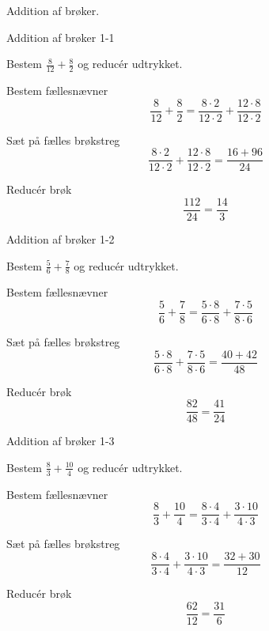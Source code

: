 \documentclass{article}
\begin{document}
Addition af brøker.

	\tableofcontents
	\newpage
	
	\begin{exercise}{Addition af brøker 1-1}
		
		Bestem $\frac{8}{12}+\frac{8}{2}$ og reducér udtrykket.
		
		
		\hint
		
		Bestem fællesnævner
		\[
		\frac{8}{12}+\frac{8}{2}  = \frac{8 \cdot 2}{12 \cdot 2}+\frac{12 \cdot 8}{12\cdot 2} 
		\]
		
		\hint
		
		Sæt på fælles brøkstreg
		\[
		\frac{8 \cdot 2}{12 \cdot 2}+\frac{12 \cdot 8}{12\cdot 2} = \frac{16+96}{24} 
		\]
		
		\hint
		
		Reducér brøk
		\[
		\frac{112}{24} = \frac{14}{3}
		\]
		
	\end{exercise}
	
	\newpage
	
	\begin{exercise}{Addition af brøker 1-2}
		
		Bestem $\frac{5}{6}+\frac{7}{8}$ og reducér udtrykket.
		
		
		\hint
		
		Bestem fællesnævner
		\[
		\frac{5}{6}+\frac{7}{8}  = \frac{5 \cdot 8 }{6 \cdot 8}+\frac{7 \cdot 5}{8\cdot 6} 
		\]
		
		\hint
		
		Sæt på fælles brøkstreg
		\[
		\frac{5 \cdot 8 }{6 \cdot 8}+\frac{7 \cdot 5}{8\cdot 6}  = \frac{40+42}{48} 
		\]
		
		\hint
		
		Reducér brøk
		\[
		\frac{82}{48} = \frac{41}{24}
		\]
		
	\end{exercise}
	
	\newpage
	
	\begin{exercise}{Addition af brøker 1-3}
		
		Bestem $\frac{8}{3}+\frac{10}{4}$ og reducér udtrykket.
		
		
		\hint
		
		Bestem fællesnævner
		\[
		\frac{8}{3}+\frac{10}{4}  = \frac{8 \cdot 4 }{3 \cdot 4}+\frac{3 \cdot 10}{4\cdot 3} 
		\]
		
		\hint
		
		Sæt på fælles brøkstreg
		\[
		\frac{8 \cdot 4 }{3 \cdot 4}+\frac{3 \cdot 10}{4\cdot 3}  = \frac{32+30}{12} 
		\]
		
		\hint
		
		Reducér brøk
		\[
		\frac{62}{12} = \frac{31}{6}
		\]
		
	\end{exercise}
	
\end{document}
